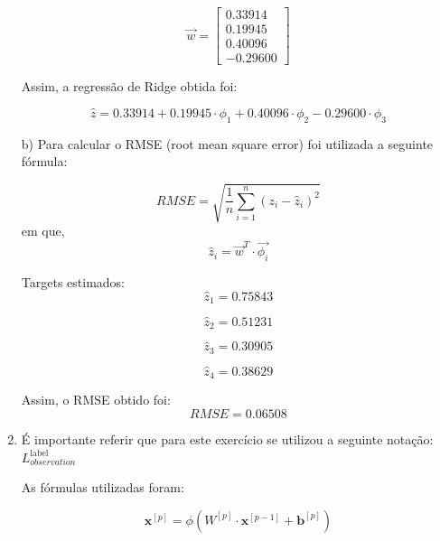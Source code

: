\documentclass[a4paper,12pt]{article} %
\begin{document}
\begin{enumerate}
\begin{equation*}
    \vec{w} = \begin{bmatrix}  0.33914 \\ 0.19945 \\ 0.40096 \\ -0.29600 \end{bmatrix}
\end{equation*}

Assim, a regressão de Ridge obtida foi:

\begin{equation*}  
    \hat{z} = 0.33914 + 0.19945 \cdot \phi_1 + 0.40096 \cdot \phi_2 - 0.29600 \cdot \phi_3
\end{equation*}

b)
Para calcular o RMSE (root mean square error) foi utilizada a seguinte fórmula:

\begin{equation}
    RMSE = \sqrt{\frac{1}{n} \sum_{i=1}^{n} (z_i - \hat{z}_i)^2}
\end{equation}
em que,
\begin{equation}
    \hat{z}_i = \vec{w}^T \cdot \vec{\phi_i}
\end{equation}
 
Targets estimados:
\begin{equation*}
    \hat{z}_1 = 0.75843
\end{equation*}

\begin{equation*}
    \hat{z}_2 = 0.51231
\end{equation*}

\begin{equation*}
    \hat{z}_3 = 0.30905
\end{equation*}

\begin{equation*}
    \hat{z}_4 = 0.38629
\end{equation*}

Assim, o RMSE obtido foi:
\begin{equation*}
    RMSE = 0.06508
\end{equation*}

\item
É importante referir que para este exercício se utilizou a seguinte notação: $L^{\text{label}}_{observation}$

As fórmulas utilizadas foram:

\begin{equation}
    \textbf{x}^{[p]} = \phi({W}^{[p]} \cdot \textbf{x}^{[p-1]} + \textbf{b}^{[p]})
\end{equation}


\end{enumerate}
\end{document}
